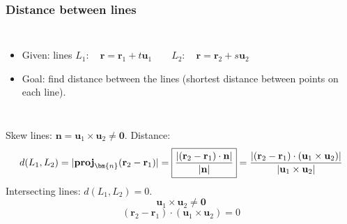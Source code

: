 \begin{frame}
\frametitle{Distance between lines}
\begin{columns}
\begin{itemize}
\item Given: lines $L_1: \quad \textbf{r}= \textbf{r}_1+t\textbf{u}_1 \qquad L_2: \quad \textbf{r}= \textbf{r}_2+s\textbf{u}_2$
\item Goal: find distance between the lines (shortest distance between points on each line).
\end{itemize}


\end{columns}
\alert<1->{Skew lines}: $\textbf{n} = \textbf{u}_1 \times \textbf{u}_2 \neq \textbf{0}$. \alert<1->{Distance}:
$$d(L_1,L_2)  = |\textbf{\text{proj}}_{\bm{n}} (\textbf{r}_2-\textbf{r}_1)| = \boxed{\frac{|(\textbf{r}_2-\textbf{r}_1)\cdot \textbf{n}|}{|\textbf{n}|}}= \frac{|(\textbf{r}_2-\textbf{r}_1)\cdot (\textbf{u}_1\times \textbf{u}_2)|}{|\textbf{u}_1\times \textbf{u}_2|}$$
\alert<1>{Intersecting} lines: $d(L_1,L_2)=0$.
$$\textbf{u}_1\times \textbf{u}_2 \neq \textbf{0}$$
$$(\textbf{r}_2-\textbf{r}_1) \cdot (\textbf{u}_1\times \textbf{u}_2) = 0$$
\end{frame}
